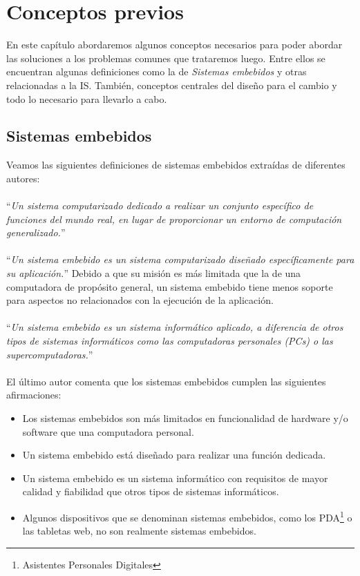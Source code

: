 \chapter{Conceptos previos}

En este capítulo abordaremos algunos conceptos necesarios para poder abordar las soluciones a los problemas comunes que trataremos luego. Entre ellos se encuentran algunas definiciones como la de \textit{Sistemas embebidos} y otras relacionadas a la IS. También, conceptos centrales del diseño para el cambio y todo lo necesario para llevarlo a cabo.


\section{Sistemas embebidos}
Veamos las siguientes definiciones de sistemas embebidos extraídas de diferentes autores:
\\\\
\noindent
``\textit{Un sistema computarizado dedicado a realizar un conjunto específico de funciones del mundo real, en lugar de proporcionar un entorno de computación generalizado.}''~\cite{douglass}
\\\\
\noindent
``\textit{Un sistema embebido es un sistema computarizado diseñado específicamente para su aplicación.}'' Debido a que su misión es más limitada que la de una computadora de propósito general, un sistema embebido tiene menos soporte para aspectos no relacionados con la ejecución de la aplicación.~\cite{elecia}
\\\\
\noindent
``\textit{Un sistema embebido es un sistema informático aplicado, a diferencia de otros tipos de sistemas informáticos como las computadoras personales (PCs) o las supercomputadoras.}''~\cite{noergaard2005embedded}
\\\\
\noindent		
El último autor comenta que los sistemas embebidos cumplen las siguientes afirmaciones:
\begin{itemize}
	\item Los sistemas embebidos son más limitados en funcionalidad de hardware y/o software que una computadora personal.
	\item Un sistema embebido está diseñado para realizar una función dedicada.
	\item Un sistema embebido es un sistema informático con requisitos de mayor calidad y fiabilidad que otros tipos de sistemas informáticos.
	\item Algunos dispositivos que se denominan sistemas embebidos, como los PDA\footnote{Asistentes Personales Digitales} o las tabletas web, no son realmente sistemas embebidos.
\end{itemize}

